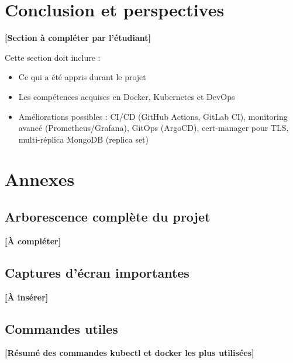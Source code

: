 \documentclass[12pt,a4paper]{report}
\begin{document}
\chapter{Conclusion et perspectives}
\textbf{[Section à compléter par l'étudiant]}

Cette section doit inclure :

\begin{itemize}
\item Ce qui a été appris durant le projet
\item Les compétences acquises en Docker, Kubernetes et DevOps
\item Améliorations possibles : CI/CD (GitHub Actions, GitLab CI), monitoring avancé (Prometheus/Grafana), GitOps (ArgoCD), cert-manager pour TLS, multi-réplica MongoDB (replica set)
\end{itemize}

\chapter*{Annexes}

\section*{Arborescence complète du projet}
\textbf{[À compléter]}

\section*{Captures d'écran importantes}
\textbf{[À insérer]}

\section*{Commandes utiles}
\textbf{[Résumé des commandes kubectl et docker les plus utilisées]}
\end{document}
